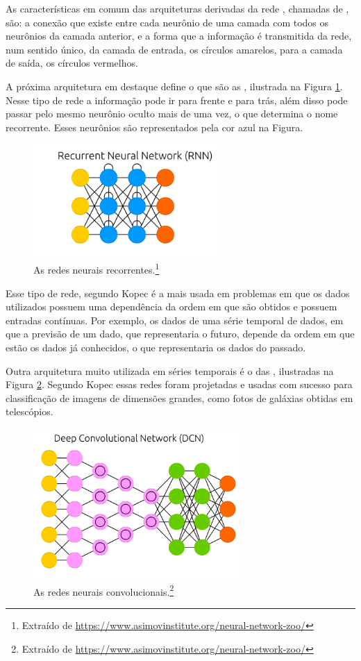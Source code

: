 As características em comum das arquiteturas derivadas da rede , chamadas de , são: a conexão que existe entre cada neurônio de uma camada com todos os neurônios da camada anterior, e a forma que a informação é transmitida da rede, num sentido único, da camada de entrada, os círculos amarelos, para a camada de saída, os círculos vermelhos.

A próxima arquitetura em destaque define o que são as , ilustrada na Figura \ref{fig:estrutura_r}. Nesse tipo de rede a informação pode ir para frente e para trás, além disso pode passar pelo mesmo neurônio oculto mais de uma vez, o que determina o nome recorrente. Esses neurônios são representados pela cor azul na Figura.

\begin{figure}[htb]
\centering
\includegraphics[width=7cm]{figuras/estrutura_r}
\caption{As redes neurais recorrentes.\footnote{Extraído de \url{https://www.asimovinstitute.org/neural-network-zoo/}}}
\label{fig:estrutura_r}
\end{figure}

Esse tipo de rede, segundo Kopec \citep{classic} é a mais usada em problemas em que os dados utilizados possuem uma dependência da ordem em que são obtidos e possuem entradas contínuas. Por exemplo, os dados de uma série temporal de dados, em que a previsão de um dado, que representaria o futuro, depende da ordem em que estão os dados já conhecidos, o que representaria os dados do passado.

Outra arquitetura muito utilizada em séries temporais é o das , ilustradas na Figura \ref{fig:estrutura_c}.  Segundo Kopec \citep{classic} essas redes foram projetadas e usadas com sucesso para classificação de imagens de dimensões grandes, como fotos de galáxias obtidas em telescópios.

\begin{figure}[htb]
\centering
\includegraphics[width=8cm]{figuras/estrutura_c}
\caption{As redes neurais convolucionais.\footnote{Extraído de \url{https://www.asimovinstitute.org/neural-network-zoo/}}}
\label{fig:estrutura_c}
\end{figure}

